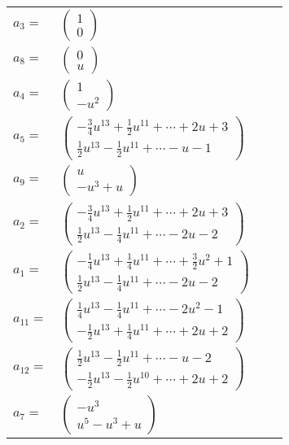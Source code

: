 \documentclass[1p]{elsarticle_modified}
\theoremstyle{definition}
\begin{document}
\begin{tabular}{m{7pt} m{180pt} m{7pt} m{180pt} }
\flushright $a_{3}=$&$\begin{pmatrix}1\\0\end{pmatrix}$ \\
\flushright $a_{8}=$&$\begin{pmatrix}0\\u\end{pmatrix}$ \\
\flushright $a_{4}=$&$\begin{pmatrix}1\\- u^2\end{pmatrix}$ \\
\flushright $a_{5}=$&$\begin{pmatrix}-\frac{3}{4} u^{13}+\frac{1}{2} u^{11}+\cdots+2 u+3\\\frac{1}{2} u^{13}-\frac{1}{2} u^{11}+\cdots- u-1\end{pmatrix}$ \\
\flushright $a_{9}=$&$\begin{pmatrix}u\\- u^3+u\end{pmatrix}$ \\
\flushright $a_{2}=$&$\begin{pmatrix}-\frac{3}{4} u^{13}+\frac{1}{2} u^{11}+\cdots+2 u+3\\\frac{1}{2} u^{13}-\frac{1}{4} u^{11}+\cdots-2 u-2\end{pmatrix}$ \\
\flushright $a_{1}=$&$\begin{pmatrix}-\frac{1}{4} u^{13}+\frac{1}{4} u^{11}+\cdots+\frac{3}{2} u^2+1\\\frac{1}{2} u^{13}-\frac{1}{4} u^{11}+\cdots-2 u-2\end{pmatrix}$ \\
\flushright $a_{11}=$&$\begin{pmatrix}\frac{1}{4} u^{13}-\frac{1}{4} u^{11}+\cdots-2 u^2-1\\-\frac{1}{2} u^{13}+\frac{1}{4} u^{11}+\cdots+2 u+2\end{pmatrix}$ \\
\flushright $a_{12}=$&$\begin{pmatrix}\frac{1}{2} u^{13}-\frac{1}{2} u^{11}+\cdots- u-2\\-\frac{1}{2} u^{13}-\frac{1}{2} u^{10}+\cdots+2 u+2\end{pmatrix}$ \\
\flushright $a_{7}=$&$\begin{pmatrix}- u^3\\u^5- u^3+u\end{pmatrix}$ \\

\end{tabular}
\end{document}

